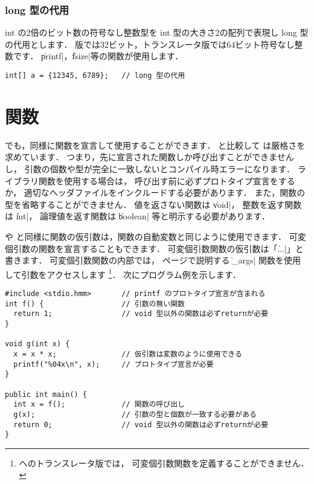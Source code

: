 \subsubsection{long 型の代用}

int の2倍のビット数の符号なし整数型を
int 型の大きさ2の配列で表現し long 型の代用とします．
{\tac}版では32ビット，トランスレータ版では64ビット符号なし整数です．
\|printf|，\|fsize|等の関数が使用します．

\begin{mylist}
\begin{verbatim}
int[] a = {12345, 6789};   // long 型の代用
\end{verbatim}
\end{mylist}



\section{関数}
\label{chap3:func}
\cmml でも，\cl 同様に関数を宣言して使用することができます．
\cl と比較して \cmml は厳格さを求めています．
つまり，先に宣言された関数しか呼び出すことができませんし，
引数の個数や型が完全に一致しないとコンパイル時エラーになります．
ライブラリ関数を使用する場合は，
呼び出す前に必ずプロトタイプ宣言をするか，
適切なヘッダファイルをインクルードする必要があります．
また，関数の型を省略することができません．
値を返さない関数は \|void|，
整数を返す関数は \|int|，
論理値を返す関数は \|boolean| 等と明示する必要があります．

\cl や \javal と同様に関数の仮引数は，関数の自動変数と同じように使用できます．
可変個引数の関数を宣言することもできます．
可変個引数関数の仮引数は「\|...|」と書きます．
可変個引数関数の内部では，
\pageref{chap4:args}ページで説明する
\|_args| 関数を使用して引数をアクセスします
\footnote{\cl へのトランスレータ版では，
可変個引数関数を定義することができません．}．
次にプログラム例を示します．

\begin{mylist}
\begin{verbatim}
#include <stdio.hmm>       // printf のプロトタイプ宣言が含まれる
int f() {                  // 引数の無い関数
  return 1;                // void 型以外の関数は必ずreturnが必要
}

void g(int x) {
  x = x * x;               // 仮引数は変数のように使用できる
  printf("%04x\n", x);     // プロトタイプ宣言が必要
}

public int main() {
  int x = f();             // 関数の呼び出し
  g(x);                    // 引数の型と個数が一致する必要がある
  return 0;                // void 型以外の関数は必ずreturnが必要
}
\end{verbatim}
\end{mylist}

